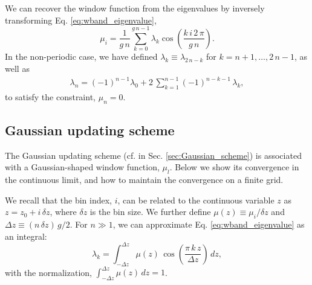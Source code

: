 \documentclass[preprint, superscriptaddress, floatfix]{revtex4-1}
\begin{document}

We can recover the window function from the eigenvalues
by inversely transforming Eq. \eqref{eq:wband_eigenvalue},
%
\begin{equation}
  \mu_i
  =
  \frac { 1 } { g \, n }
  \sum_{ k = 0 }^{ g \, n - 1 }
  \lambda_k
  \cos \left(
       \frac{ k \, i \, 2 \, \pi }
            {      g \, n        }
  \right)
  .
\label{eq:mu_from_lambda}
\end{equation}
%
In the non-periodic case,
we have defined
$\lambda_k \equiv \lambda_{2 \, n - k}$
for $k = n + 1, \dots, 2 \, n - 1$,
as well as
%
\begin{align}
  \lambda_n
  =
  (-1)^{ n - 1 }
  \lambda_0
  +
  2 \, \sum_{ k = 1 }^{ n - 1 }
      (-1)^{n - k - 1} \, \lambda_k
  ,
\label{eq:lambdan}
\end{align}
to satisfy the constraint, $\mu_n = 0$.
%





\subsection{\label{sec:Gaussian_math}
Gaussian updating scheme}



The Gaussian updating scheme (cf. in Sec. \ref{sec:Gaussian_scheme})
is associated with a Gaussian-shaped window function, $\mu_l$.
%
%
Below we show its convergence
in the continuous limit,
and how to maintain the convergence
on a finite grid.



We recall that
the bin index, $i$, can be related to
the continuous variable $z$ as
$z = z_0 + i \, \delta z$,
where
$\delta z$ is the bin size.
%
We further define
$\mu(z) \equiv \mu_i/\delta z$
and
$\Delta z \equiv (n \, \delta z) \, g / 2$.
%
For $n \gg 1$,
we can approximate Eq. \eqref{eq:wband_eigenvalue}
as an integral:
%
\begin{equation}
  \lambda_k
  =
  \int_{-\Delta z}^{\Delta z}
    \mu(z) \, \cos\left( \frac{ \pi \, k \, z } { \Delta z} \right)
    \, d z,
  \label{eq:lambda_int}
\end{equation}
%
with the normalization,
$\int_{-\Delta z}^{\Delta z} \mu(z) \, dz = 1$.
\end{document}
